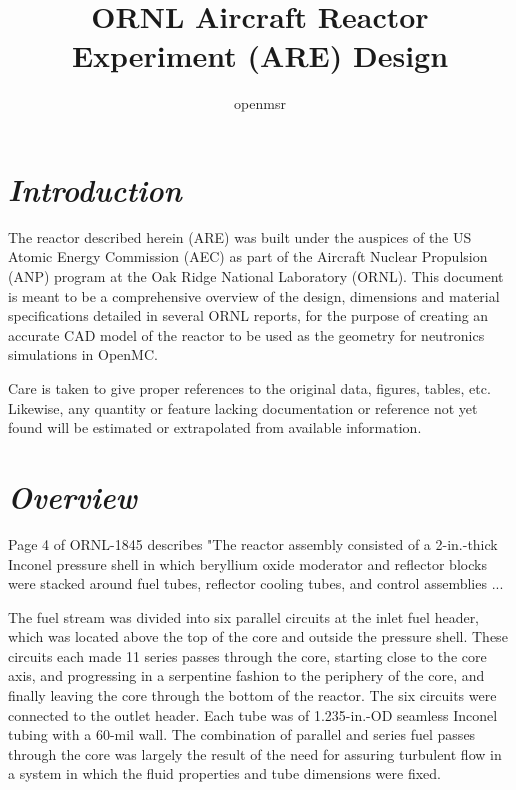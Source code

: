 \documentclass[ms,a4paper]{memoir}
\title{ORNL Aircraft Reactor Experiment (ARE) Design}
\author{openmsr}
\date{}
\begin{document}
\maketitle

\vspace{-4cm}
\renewcommand{\contentsname}{contents}
\tableofcontents*

\section{\emph{Introduction}}

The reactor described herein (ARE) was built under the auspices of the US Atomic Energy Commission (AEC) as part of the Aircraft Nuclear Propulsion (ANP) program at the Oak Ridge National Laboratory (ORNL). This document is meant to be a comprehensive overview of the design, dimensions and material specifications detailed in several ORNL reports, for the purpose of creating an accurate CAD model of the reactor to be used as the geometry for neutronics simulations in OpenMC.

Care is taken to give proper references to the original data, figures, tables, etc. Likewise, any quantity or feature  lacking documentation or reference not yet found will be estimated or extrapolated from available information.

\section{\emph{Overview}}

Page 4 of ORNL-1845 describes "The reactor assembly consisted of a 2-in.-thick Inconel pressure shell in which beryllium oxide moderator and reflector blocks were stacked around fuel tubes, reflector cooling tubes, and control assemblies ...

The fuel stream was divided into six parallel circuits at the inlet fuel header, which was located above the top of the core and outside the pressure shell. These circuits each made 11 series passes through the core, starting close to the core axis, and progressing in a serpentine fashion to the periphery of the core, and finally leaving the core through the bottom of the reactor. The six circuits were connected to the outlet header. Each tube was of 1.235-in.-OD seamless Inconel tubing with a 60-mil wall. The combination of parallel and series fuel passes through the core was largely the result of the need for assuring turbulent flow in a system in which the fluid properties and tube dimensions were fixed.
\end{document}
